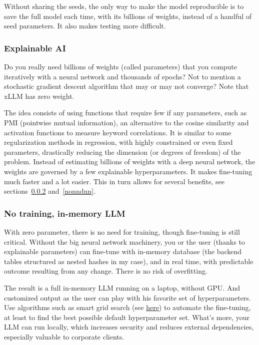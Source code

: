 \documentclass[10pt]{article}
\begin{document}
{Without sharing the seeds, the only way to make the model reproducible is to save the full model each time, with its billions of weights, instead of a handful of seed parameters. It also makes testing more difficult.


\subsubsection{Explainable AI}
Do you really need billions of weights (called parameters) that you compute iteratively with a neural network and thousands of epochs? Not to mention a stochastic gradient descent algorithm that may or may not converge? Note that xLLM has zero weight.  

The idea consists of using functions that require few if any parameters, such as PMI (pointwise mutual information), an alternative to the cosine similarity and activation functions to measure keyword correlations. It is similar to some regularization methods in regression, with highly constrained or even fixed parameters, drastically reducing the dimension (or degrees of freedom) of the problem. Instead of estimating billions of weights with a deep neural network, the weights are governed by a few explainable 
\textcolor{index}{hyperparameters}. It makes fine-tuning much faster and a lot easier. This in turn allows for several benefits, see sections~\ref{notr32} and~\ref{nonndnn}.

\subsubsection{No training, in-memory LLM}\label{notr32}
With zero parameter, there is no need for \textcolor{index}{training}, though fine-tuning is still critical. Without the big neural network machinery, you or the user (thanks to explainable parameters) can fine-tune with in-memory database (the backend tables structured as nested hashes in my case), and in real time, with predictable outcome resulting from any change. There is no risk of \textcolor{index}{overfitting}.

The result is a full \textcolor{index}{in-memory LLM} running on a laptop, without GPU. And customized output as the user can play with his favorite set of hyperparameters. Use algorithms such as 
\textcolor{index}{smart grid search} (see \href{https://mltblog.com/3zgI8b5}{here}) to automate the fine-tuning, at least to find the best possible default hyperparameter set. What’s more, your LLM can run locally, which increases security and reduces external dependencies, especially valuable to corporate clients.


}
\end{document}
